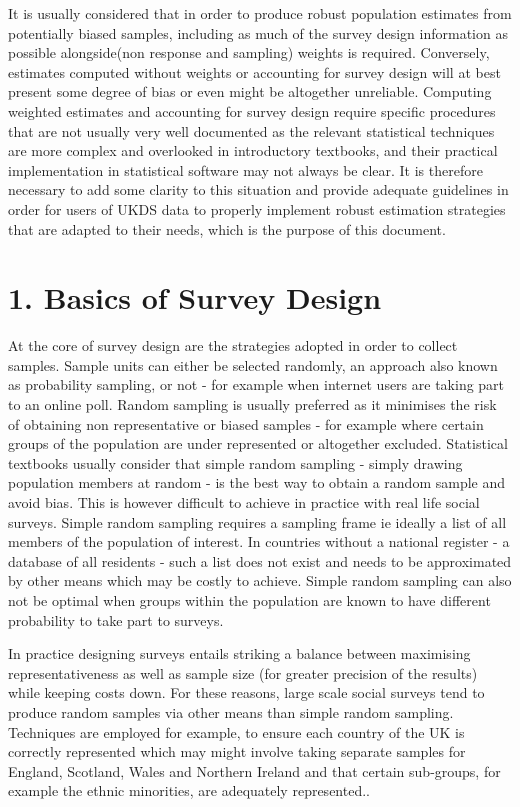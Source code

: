 \documentclass[
  14,
  a4paper,
  DIV=11,
  numbers=noendperiod]{scrartcl}
\begin{document}
It is usually considered that in order to produce robust population
estimates from potentially biased samples, including as much of the
survey design information as possible alongside(non response and
sampling) weights is required. Conversely, estimates computed without
weights or accounting for survey design will at best present some degree
of bias or even might be altogether unreliable. Computing weighted
estimates and accounting for survey design require specific procedures
that are not usually very well documented as the relevant statistical
techniques are more complex and overlooked in introductory textbooks,
and their practical implementation in statistical software may not
always be clear. It is therefore necessary to add some clarity to this
situation and provide adequate guidelines in order for users of UKDS
data to properly implement robust estimation strategies that are adapted
to their needs, which is the purpose of this document.

\hypertarget{basics-of-survey-design}{%
\section{1. Basics of Survey Design}\label{basics-of-survey-design}}

At the core of survey design are the strategies adopted in order to
collect samples. Sample units can either be selected randomly, an
approach also known as probability sampling, or not - for example when
internet users are taking part to an online poll. Random sampling is
usually preferred as it minimises the risk of obtaining non
representative or biased samples - for example where certain groups of
the population are under represented or altogether excluded. Statistical
textbooks usually consider that simple random sampling - simply drawing
population members at random - is the best way to obtain a random sample
and avoid bias. This is however difficult to achieve in practice with
real life social surveys. Simple random sampling requires a sampling
frame ie ideally a list of all members of the population of interest. In
countries without a national register - a database of all residents -
such a list does not exist and needs to be approximated by other means
which may be costly to achieve. Simple random sampling can also not be
optimal when groups within the population are known to have different
probability to take part to surveys.

In practice designing surveys entails striking a balance between
maximising representativeness as well as sample size (for greater
precision of the results) while keeping costs down. For these reasons,
large scale social surveys tend to produce random samples via other
means than simple random sampling. Techniques are employed for example,
to ensure each country of the UK is correctly represented which may
might involve taking separate samples for England, Scotland, Wales and
Northern Ireland and that certain sub-groups, for example the ethnic
minorities, are adequately represented..
\end{document}
